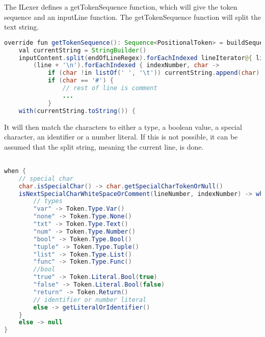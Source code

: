 The ILexer defines a getTokenSequence function, which will give the token sequence and an inputLine function.
The getTokenSequence function will split the text string.
\begin{lstlisting}[language=java,label=lis:LexerStringSplit,caption=The string is being split and new lines are added to the string .,firstnumber=8]
override fun getTokenSequence(): Sequence<PositionalToken> = buildSequence {
	val currentString = StringBuilder()
	inputContent.split(endOfLineRegex).forEachIndexed lineIterator@{ lineNumber, line ->
		(line + '\n').forEachIndexed { indexNumber, char ->
			if (char !in listOf(' ', '\t')) currentString.append(char)
			if (char == '#') {
				// rest of line is comment
				...
			}
	with(currentString.toString()) {
\end{lstlisting}		
It will then match the characters to either a type, a boolean value, a special character, an identifier or a number literal.
If this is not possible, it can be assumed that the split string, meaning the current line, is done.
\begin{lstlisting}[language=java,label=lis:LexerStringMatcher,caption=The split string is being matched to a token,firstnumber=19]

when {
	// special char
	char.isSpecialChar() -> char.getSpecialCharTokenOrNull()
	isNextSpecialCharWhiteSpaceOrComment(lineNumber, indexNumber) -> when (this) {
		// types
		"var" -> Token.Type.Var()
		"none" -> Token.Type.None()
		"txt" -> Token.Type.Text()
		"num" -> Token.Type.Number()
		"bool" -> Token.Type.Bool()
		"tuple" -> Token.Type.Tuple()
		"list" -> Token.Type.List()
		"func" -> Token.Type.Func()
		//bool
		"true" -> Token.Literal.Bool(true)
		"false" -> Token.Literal.Bool(false)
		"return" -> Token.Return()
		// identifier or number literal
		else -> getLiteralOrIdentifier()
	}
	else -> null
}
\end{lstlisting}
